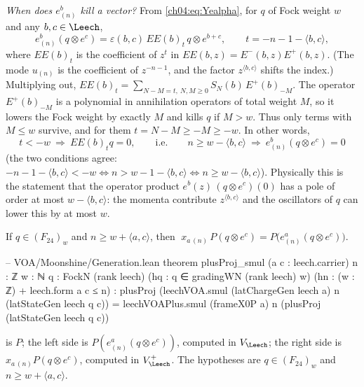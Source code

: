 \emph{When does $e^b_{(n)}$ kill a vector?} From \eqref{ch04:eq:Yealpha}, for $q$ of Fock weight $w$
and any $b,c\in\Leech$,
\begin{equation}\label{ch04:eq:eamode}
  e^b_{(n)}(q\otimes e^c)=\varepsilon(b,c)\,EE(b)_{t}\,q\otimes e^{b+c},\qquad t=-n-1-\langle b,c\rangle,
\end{equation}
where $EE(b)_t$ is the coefficient of $z^t$ in $EE(b,z)=E^-(b,z)E^+(b,z)$. (The mode $u_{(n)}$ is the
coefficient of $z^{-n-1}$, and the factor $z^{\langle b,c\rangle}$ shifts the index.) Multiplying out,
$EE(b)_t=\sum_{N-M=t,\ N,M\ge0}S_N(b)\,E^+(b)_{-M}$. The operator $E^+(b)_{-M}$ is a polynomial in
annihilation operators of total weight $M$, so it lowers the Fock weight by exactly $M$ and kills
$q$ if $M>w$. Thus only terms with $M\le w$ survive, and for them $t=N-M\ge-M\ge-w$. In other words,
\begin{equation}\label{ch04:eq:kill}
  t<-w\ \Longrightarrow\ EE(b)_tq=0,\qquad\text{i.e.}\qquad
  n\ge w-\langle b,c\rangle\ \Longrightarrow\ e^b_{(n)}(q\otimes e^c)=0
\end{equation}
(the two conditions agree: $-n-1-\langle b,c\rangle<-w\iff n>w-1-\langle b,c\rangle\iff n\ge w-\langle b,c\rangle$).
Physically this is the statement that the operator product $e^b(z)\,(q\otimes e^c)(0)$ has a pole of
order at most $w-\langle b,c\rangle$: the momenta contribute $z^{\langle b,c\rangle}$ and the oscillators of $q$
can lower this by at most $w$.

\begin{lemma}\label{ch04:lem:safe}
If $q\in(F_{24})_w$ and $n\ge w+\langle a,c\rangle$, then
$\;x_{a\,(n)}\,P(q\otimes e^c)=P\big(e^a_{(n)}(q\otimes e^c)\big)$.
\end{lemma}

\begin{leancode}
-- VOA/Moonshine/Generation.lean
theorem plusProj_smul (a c : leech.carrier) {n : ℤ} {w : ℕ} {q : FockN (rank leech)}
    (hq : q ∈ gradingWN (rank leech) w) (hn : (w : ℤ) + leech.form a c ≤ n) :
    plusProj (leechVOA.smul (latChargeGen leech a) n (latStateGen leech q c))
      = leechVOAPlus.smul (frameX0P a) n (plusProj (latStateGen leech q c))
\end{leancode}

\begin{dictionary}
 is $P$; the left side is $P(e^a_{(n)}(q\otimes e^c))$, computed in $V_\Leech$; the
right side is $x_{a\,(n)}P(q\otimes e^c)$, computed in $V_\Leech^+$. The hypotheses are $q\in(F_{24})_w$
and $n\ge w+\langle a,c\rangle$.
\end{dictionary}

